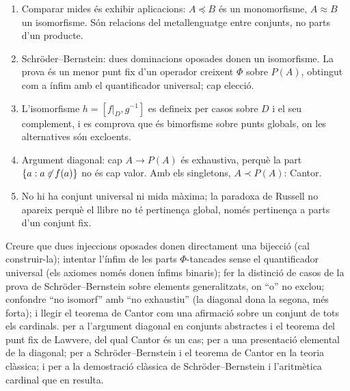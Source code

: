 \begin{resumcap}
\begin{enumerate}
  \item Comparar mides és exhibir aplicacions: \(A\preceq B\) és un monomorfisme, \(A\approx B\) un isomorfisme. Són relacions del metallenguatge entre conjunts, no parts d'un producte.
  \item Schröder--Bernstein: dues dominacions oposades donen un isomorfisme. La prova és un menor punt fix d'un operador creixent \(\Phi\) sobre \(P(A)\), obtingut com a ínfim amb el quantificador universal; cap elecció.
  \item L'isomorfisme \(h=[f|_D,g^{-1}]\) es defineix per casos sobre \(D\) i el seu complement, i es comprova que és bimorfisme sobre punts globals, on les alternatives són excloents.
  \item Argument diagonal: cap \(A\to P(A)\) és exhaustiva, perquè la part \(\{a:a\not\mathrel{\varepsilon}f(a)\}\) no és cap valor. Amb els singletons, \(A\prec P(A)\): Cantor.
  \item No hi ha conjunt universal ni mida màxima; la paradoxa de Russell no apareix perquè el llibre no té pertinença global, només pertinença a parts d'un conjunt fix.
\end{enumerate}
 Creure que dues injeccions oposades donen directament una bijecció (cal construir-la); intentar l'ínfim de les parts \(\Phi\)-tancades sense el quantificador universal (els axiomes només donen ínfims binaris); fer la distinció de casos de la prova de Schröder--Bernstein sobre elements generalitzats, on \enquote{o} no exclou; confondre \enquote{no isomorf} amb \enquote{no exhaustiu} (la diagonal dona la segona, més forta); i llegir el teorema de Cantor com una afirmació sobre un conjunt de tots els cardinals.
 \cite[§§8.1--8.3]{lawvere-rosebrugh} per a l'argument diagonal en conjunts abstractes i el teorema del punt fix de Lawvere, del qual Cantor és un cas; \cite[sessió~29]{lawvere-schanuel} per a una presentació elemental de la diagonal; \cite[§§22 i 25]{halmos} per a Schröder--Bernstein i el teorema de Cantor en la teoria clàssica; i \cite[cap.~3]{jech2003} per a la demostració clàssica de Schröder--Bernstein i l'aritmètica cardinal que en resulta.
\end{resumcap}
